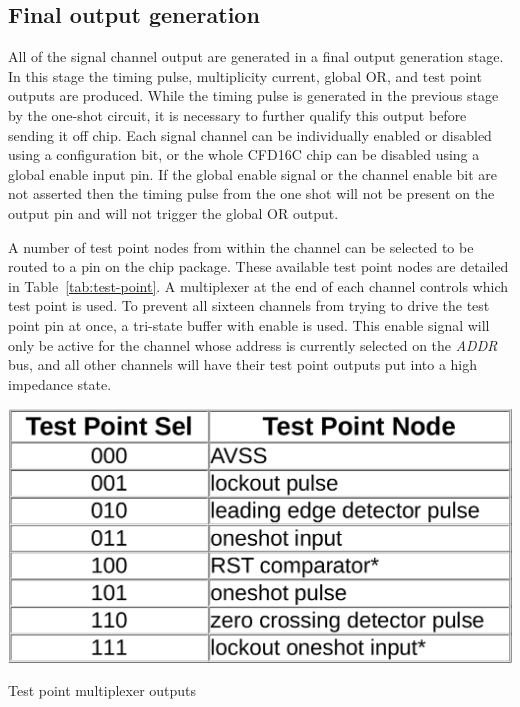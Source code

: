 \documentclass[12pt,oneside,final]{siuethesis}
\theoremstyle{definition}
\begin{document}
\subsection{Final output generation}
\par All of the signal channel output are generated in a final output generation stage. In this stage the timing pulse, multiplicity current, global OR, and test point outputs are produced. While the timing pulse is generated in the previous stage by the one-shot circuit, it is necessary to further qualify this output before sending it off chip. Each signal channel can be individually enabled or disabled using a configuration bit, or the whole CFD16C chip can be disabled using a global enable input pin. If the global enable signal or the channel enable bit are not asserted then the timing pulse from the one shot will not be present on the output pin and will not trigger the global OR output. 
\par A number of test point nodes from within the channel can be selected to be routed to a pin on the chip package. These available test point nodes are detailed in Table~\ref{tab:test-point}. A multiplexer at the end of each channel controls which test point is used. To prevent all sixteen channels from trying to drive the test point pin at once, a tri-state buffer with enable is used. This enable signal will only be active for the channel whose address is currently selected on the \emph{ADDR} bus, and all other channels will have their test point outputs put into a high impedance state.  

\begin{table}[ht]
 \centering
 \includegraphics[scale=.2,keepaspectratio=true]{../data/test_points.png}
 \caption{Test point multiplexer outputs}
 \label{tab:test-point}
\end{table}
\end{document}
